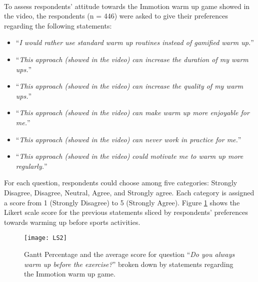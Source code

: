 \\To assess respondents' attitude towards the Immotion warm up game showed in the video, the respondents (n = 446) were asked to give their preferences regarding the following statements:
\begin{itemize}
\item ``\textit{I would rather use standard warm up routines instead of gamified warm up.}''
\item ``\textit{This approach (showed in the video) can increase the duration of my warm ups.}''
\item ``\textit{This approach (showed in the video) can increase the quality of my warm ups.}''
\item ``\textit{This approach (showed in the video) can make warm up more enjoyable for me.}''
\item ``\textit{This approach (showed in the video) can never work in practice for me.}''
\item ``\textit{This approach (showed in the video) could motivate me to warm up more regularly.}''
\end{itemize}
For each question, respondents could choose among five categories: Strongly Disagree, Disagree, Neutral, Agree, and Strongly agree. Each category is assigned a score from 1 (Strongly Disagree) to 5 (Strongly Agree). Figure \ref{fig:LS2} shows the Likert scale score for the previous statements sliced by respondents' preferences towards warming up before sports activities.\\ 
\begin{figure}[h]
    \centering
    \texttt{[image: LS2]}
    \caption[Gantt Percentage and the average score for warm up related questions. ]{Gantt Percentage and the average score for question ``\textit{Do you always warm up before the exercise?}'' broken down by statements regarding the Immotion warm up game.}
    \label{fig:LS2}
\end{figure}\\ 
